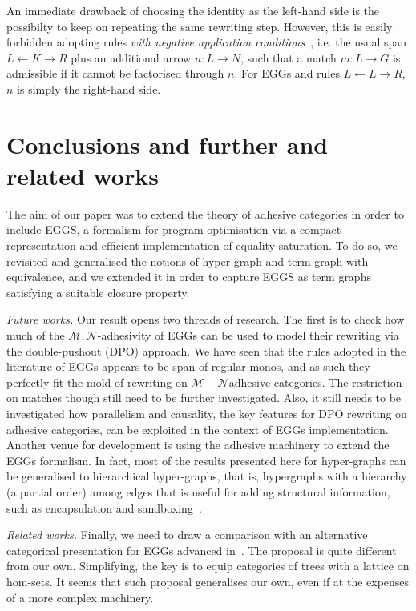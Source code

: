 \documentclass[a4paper,UKenglish,cleveref,pdftex,thm-restate,numberwithinsect]{lipics-v2021}
\begin{document}
An immediate drawback of choosing the identity as the left-hand side is the possibilty to keep on repeating the same rewriting step.
However, this is easily forbidden adopting rules \emph{with negative application conditions}~\cite{xxx}, i.e. the usual span 
$L \leftarrow K \rightarrow R$ plus an additional arrow $n: L\rightarrow N$, such that a match $m: L \to G$ is admissible if it cannot
be factorised through $n$. For EGGs and rules $L \leftarrow L \rightarrow R$, $n$ is simply the right-hand side.


\section{Conclusions and further and related works}
\label{conclusioni}
The aim of our paper was to extend the theory of adhesive categories in order to include EGGS, 
a formalism for program optimisation via a compact representation and 
efficient implementation of equality saturation.
%
To do so, we revisited and generalised the notions of hyper-graph and term graph with equivalence, and
we extended it in order to capture EGGS as term graphs satisfying a suitable closure property.

\emph{Future works.}
Our result opens two threads of research. The first is to check how much of the $\mathcal{M},\mathcal{N}$-adhesivity 
of EGGs can be used to model their rewriting via the double-pushout (DPO) approach. We have seen that 
the rules adopted in the literature of EGGs appears to be span of regular monos, and as such they
perfectly fit the mold of rewriting on $\mathcal{M}-\mathcal{N}$adhesive categories. The restriction on matches 
though still need to be further investigated.
%
Also, it still needs to be investigated how parallelism and causality, the key features for DPO rewriting
on adhesive categories, can be exploited in the context of EGGs implementation. 
Another venue for development is using the adhesive 
machinery to extend the EGGs formalism. In fact, most of the results
presented here for hyper-graphs can be generalised to hierarchical hyper-graphs, that is, 
hypergraphs with a hierarchy (a partial order) among 
edges that is useful for adding structural information, such as encapsulation and sandboxing~\cite{ghica, noi}.

\emph{Related works.}
Finally, we need to draw a comparison with an alternative categorical presentation for EGGs 
advanced in~\cite{ghica}. The proposal is quite different from our own. Simplifying, the key is to equip categories 
of trees with a lattice on hom-sets. 
It seems that such proposal generalises our own, 
even if at the expenses of a more complex machinery.
\end{document}
